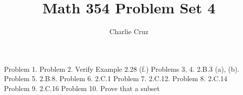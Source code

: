\documentclass{report}
\title{\Huge{Math 354} Problem Set 4}
\author{\huge{Charlie Cruz}}
\date{}
\begin{document}
\maketitle

\qs{}{}
\qs{}{}
\qs{}{}
\qs{}{}
\qs{}{}
\qs{}{}
\qs{}{}
\qs{}{}
\qs{}{}
\qs{}{}

Problem 1.
Problem 2. Verify Example 2.28 (f.)
Problems 3, 4. 2.B.3 (a), (b).
Problem 5. 2.B.8.
Problem 6. 2.C.1
Problem 7. 2.C.12.
Problem 8. 2.C.14
Problem 9. 2.C.16
Problem 10. Prove that a subset  
\end{document}
